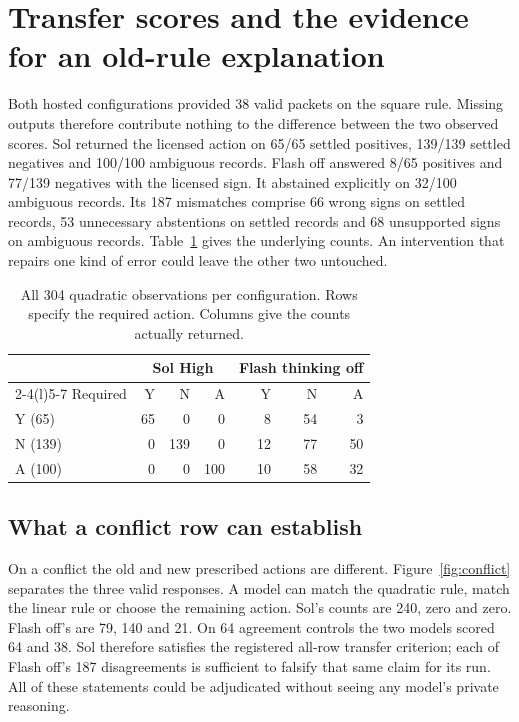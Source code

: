 \documentclass[12pt,letterpaper]{article}
\begin{document}
\section{Transfer scores and the evidence for an old-rule explanation}\label{sec:transfer}
Both hosted configurations provided 38 valid packets on the square rule. Missing outputs therefore contribute nothing to the difference between the two observed scores. Sol returned the licensed action on 65/65 settled positives, 139/139 settled negatives and 100/100 ambiguous records. Flash off answered 8/65 positives and 77/139 negatives with the licensed sign. It abstained explicitly on 32/100 ambiguous records. Its 187 mismatches comprise 66 wrong signs on settled records, 53 unnecessary abstentions on settled records and 68 unsupported signs on ambiguous records. Table~\ref{tab:squareconf} gives the underlying counts. An intervention that repairs one kind of error could leave the other two untouched.
\begin{table}[htbp]\centering\small
\caption{All 304 quadratic observations per configuration. Rows specify the required action. Columns give the counts actually returned.}\label{tab:squareconf}
\begin{tabular}{@{}lrrrrrr@{}}\toprule
&\multicolumn{3}{c}{Sol High}&\multicolumn{3}{c}{Flash thinking off}\\
\cmidrule(lr){2-4}\cmidrule(l){5-7}
Required&Y&N&A&Y&N&A\\\midrule
Y (65)&65&0&0&8&54&3\\
N (139)&0&139&0&12&77&50\\
A (100)&0&0&100&10&58&32\\\bottomrule
\end{tabular}
\end{table}

\subsection{What a conflict row can establish}
On a conflict the old and new prescribed actions are different. Figure~\ref{fig:conflict} separates the three valid responses. A model can match the quadratic rule, match the linear rule or choose the remaining action. Sol's counts are 240, zero and zero. Flash off's are 79, 140 and 21. On 64 agreement controls the two models scored 64 and 38. Sol therefore satisfies the registered all-row transfer criterion; each of Flash off's 187 disagreements is sufficient to falsify that same claim for its run. All of these statements could be adjudicated without seeing any model's private reasoning.
\end{document}
